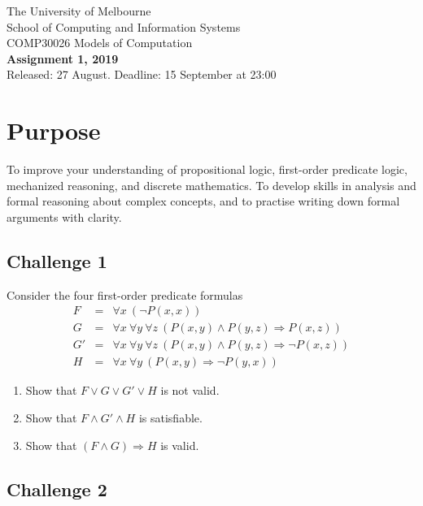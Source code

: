\documentclass[12pt]{article}
\newcommand{\impl}{\mathbin{\Rightarrow}}
\begin{document}
\begin{center}
{\sc The University of Melbourne
\\
School of Computing and Information Systems
\\ 
COMP30026 Models of Computation}
\bigskip \\
{\Large\bf Assignment 1, 2019}
\bigskip \\
{\large Released: 27 August.  Deadline: 15 September at 23:00}
\end{center}

\section*{Purpose}
To improve your understanding of propositional logic, first-order 
predicate logic, mechanized reasoning, and discrete mathematics.
To develop skills in analysis and formal reasoning about complex concepts,
and to practise writing down formal arguments with clarity.


\subsection*{Challenge 1}
Consider the four first-order predicate formulas
\[
\begin{array}{lll}
   F & = & \forall x\ (\neg P(x,x))
\\ G & = &
    \forall x\ \forall y\ \forall z\ (P(x,y) \land P(y,z) \impl P(x,z))
\\ G' & = &
    \forall x\ \forall y\ \forall z\ (P(x,y) \land P(y,z) \impl \neg P(x,z))
\\ H & = & \forall x\ \forall y\ (P(x,y) \impl \neg P(y,x))
\end{array}
\]
\begin{enumerate}
\setlength{\itemsep}{-0.3ex}
\item
Show that $F \lor G \lor G' \lor H$ is not valid.
\item
Show that $F \land G' \land H$ is satisfiable.
\item
Show that $(F \land G) \impl H$ is valid.
\end{enumerate}

\subsection*{Challenge 2}
\end{document}
